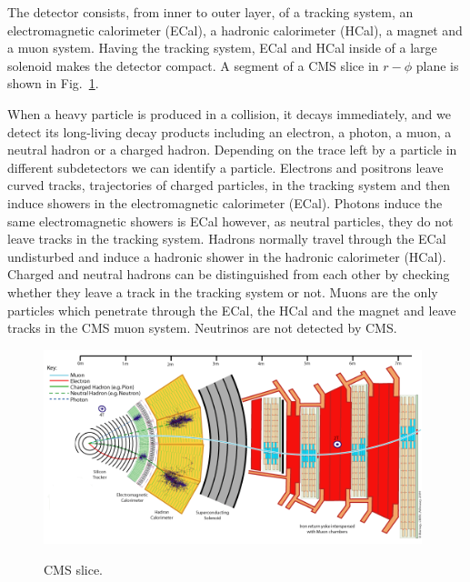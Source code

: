 The detector consists, from inner to outer layer,  of a tracking system, an electromagnetic calorimeter (ECal), a hadronic calorimeter (HCal), a magnet and a muon system. Having the tracking system, ECal and HCal inside of a large solenoid makes the detector compact. A segment of a CMS slice in $r-\phi$ plane is shown in Fig.~\ref{fig:CMS_slice}.

When a heavy particle is produced in a collision, it decays immediately, and we detect its long-living decay products including an electron, a photon, a muon, a neutral hadron or a charged hadron. Depending on the trace left by a particle in different subdetectors we can identify a particle. Electrons and positrons leave curved tracks, trajectories of charged particles, in the tracking system and then induce showers in the electromagnetic calorimeter (ECal). Photons induce the same electromagnetic showers is ECal however, as neutral particles, they do not leave tracks in the tracking system. Hadrons normally travel through the ECal undisturbed and induce a hadronic shower in the hadronic calorimeter (HCal). Charged and neutral hadrons can be distinguished from each other by checking whether they leave a track in the tracking system or not. Muons are the only particles which penetrate through the ECal, the HCal and the magnet and leave tracks in the CMS muon system. Neutrinos are not detected by CMS.   

\begin{figure}[htb]
  \begin{center}
    {\includegraphics[width=0.98\textwidth]{../figs/Exp/CMS_Slice.png}}
    \caption{CMS slice.}
    \label{fig:CMS_slice}
  \end{center}
\end{figure}

